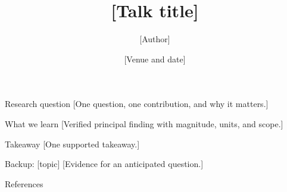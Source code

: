 \documentclass[aspectratio=169,12pt]{beamer}
\title{[Talk title]}
\author{[Author]}
\institute{[Institution]}
\date{[Venue and date]}
\begin{document}
\begin{frame}[plain]
  \titlepage
\end{frame}

\begin{frame}{Research question}
  [One question, one contribution, and why it matters.]
\end{frame}

\begin{frame}{What we learn}
  [Verified principal finding with magnitude, units, and scope.]
\end{frame}


\begin{frame}{Takeaway}
  [One supported takeaway.]
\end{frame}

\appendix

\begin{frame}{Backup: [topic]}
  [Evidence for an anticipated question.]
\end{frame}

\begin{frame}{References}
  
  
\end{frame}
\end{document}
